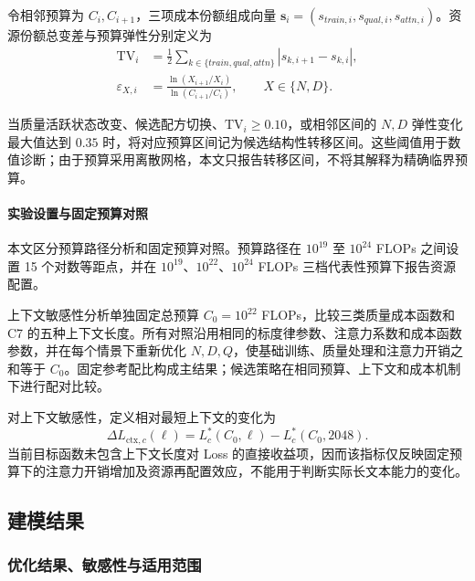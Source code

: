 \documentclass[bwprint]{gmcmthesis}
\numberwithin{equation}{section}
\numberwithin{figure}{section}
\numberwithin{table}{section}
\begin{document}
        令相邻预算为 $C_i,C_{i+1}$，三项成本份额组成向量 $\bm s_i=(s_{train,i},s_{qual,i},s_{attn,i})$。资源份额总变差与预算弹性分别定义为
        \begin{equation}
        \begin{aligned}
        \mathrm{TV}_i
        &=\frac12\sum_{k\in\{train,qual,attn\}}|s_{k,i+1}-s_{k,i}|,\\
        \varepsilon_{X,i}
        &=\frac{\ln(X_{i+1}/X_i)}{\ln(C_{i+1}/C_i)},
        \qquad X\in\{N,D\}.
        \end{aligned}
        \label{eq:p3_transition_indicators}
        \end{equation}

        当质量活跃状态改变、候选配方切换、$\mathrm{TV}_i\ge0.10$，或相邻区间的 $N,D$ 弹性变化最大值达到 $0.35$ 时，将对应预算区间记为候选结构性转移区间。这些阈值用于数值诊断；由于预算采用离散网格，本文只报告转移区间，不将其解释为精确临界预算。

        \paragraph{实验设置与固定预算对照}

        本文区分预算路径分析和固定预算对照。预算路径在 $10^{19}$ 至 $10^{24}$ FLOPs 之间设置 15 个对数等距点，并在 $10^{19}$、$10^{22}$、$10^{24}$ FLOPs 三档代表性预算下报告资源配置。

        上下文敏感性分析单独固定总预算 $C_0=10^{22}$ FLOPs，比较三类质量成本函数和 C7 的五种上下文长度。所有对照沿用相同的标度律参数、注意力系数和成本函数参数，并在每个情景下重新优化 $N,D,Q$，使基础训练、质量处理和注意力开销之和等于 $C_0$。固定参考配比构成主结果；候选策略在相同预算、上下文和成本机制下进行配对比较。

        对上下文敏感性，定义相对最短上下文的变化为
        \begin{equation}
        \Delta L_{\mathrm{ctx},c}(\ell)
        =L_c^*(C_0,\ell)-L_c^*(C_0,2048).
        \label{eq:p3_context_loss_change}
        \end{equation}
        当前目标函数未包含上下文长度对 Loss 的直接收益项，因而该指标仅反映固定预算下的注意力开销增加及资源再配置效应，不能用于判断实际长文本能力的变化。

    \subsection{建模结果}

        \subsubsection{优化结果、敏感性与适用范围}
\end{document}

